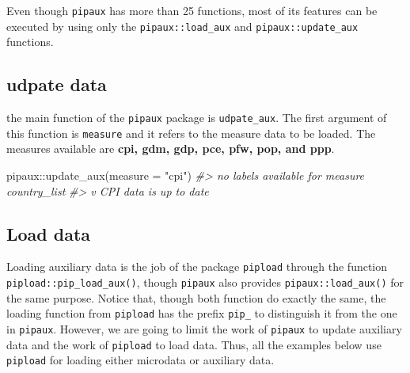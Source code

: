 \documentclass[
]{book}
\newenvironment{Shaded}{\begin{snugshade}}{\end{snugshade}}
\newcommand{\AttributeTok}[1]{\textcolor[rgb]{0.77,0.63,0.00}{#1}}
\newcommand{\CommentTok}[1]{\textcolor[rgb]{0.56,0.35,0.01}{\textit{#1}}}
\newcommand{\FunctionTok}[1]{\textcolor[rgb]{0.00,0.00,0.00}{#1}}
\newcommand{\NormalTok}[1]{#1}
\newcommand{\SpecialCharTok}[1]{\textcolor[rgb]{0.00,0.00,0.00}{#1}}
\newcommand{\StringTok}[1]{\textcolor[rgb]{0.31,0.60,0.02}{#1}}
\begin{document}
Even though \texttt{pipaux} has more than 25 functions, most of its features
can be executed by using only the \texttt{pipaux::load\_aux} and \texttt{pipaux::update\_aux} functions.

\hypertarget{udpate-data}{%
\subsection{udpate data}\label{udpate-data}}

the main function of the \texttt{pipaux} package is \texttt{udpate\_aux}. The first argument of this function is \texttt{measure} and it refers to the measure data to be loaded. The measures available are \textbf{cpi, gdm, gdp, pce, pfw, pop, and ppp}.

\begin{Shaded}
\begin{Highlighting}[]
\NormalTok{pipaux}\SpecialCharTok{::}\FunctionTok{update\_aux}\NormalTok{(}\AttributeTok{measure =} \StringTok{"cpi"}\NormalTok{)}
\CommentTok{\#\textgreater{} no labels available for measure \textasciigrave{}country\_list\textasciigrave{}}
\CommentTok{\#\textgreater{} v CPI data is up to date}
\end{Highlighting}
\end{Shaded}

\hypertarget{load-data}{%
\subsection{Load data}\label{load-data}}

Loading auxiliary data is the job of the package \texttt{pipload} through the function \texttt{pipload::pip\_load\_aux()}, though \texttt{pipaux} also provides \texttt{pipaux::load\_aux()} for the same purpose. Notice that, though both function do exactly the same, the loading function from \texttt{pipload} has the prefix \texttt{pip\_} to distinguish it from the one in \texttt{pipaux}. However, we are going to limit the work of \texttt{pipaux} to update auxiliary data and the work of \texttt{pipload} to load data. Thus, all the examples below use \texttt{pipload} for loading either microdata or auxiliary data.
\end{document}
